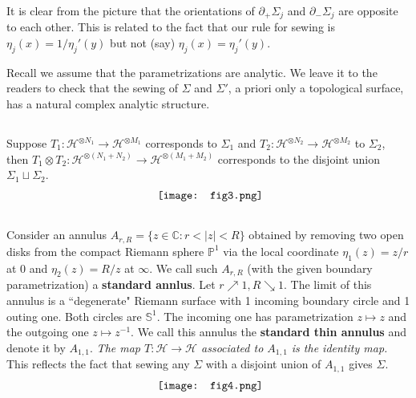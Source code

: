 \documentclass[12pt,a4paper,notitlepage]{article}
\theoremstyle{definition}
\theoremstyle{plain}
\newcommand{\mc}{\mathcal}
\newcommand{\Cbb}{\mathbb C}
\newcommand{\Pbb}{\mathbb P}
\newcommand{\Sbb}{{\mathbb S}}
\numberwithin{equation}{section}
\begin{document}
It is clear from the picture that the orientations of $\partial_+\Sigma_j$ and $\partial_-\Sigma_j$ are opposite to each other. This is related to the fact that our rule for sewing is $\eta_j(x)=1/\eta_j'(y)$ but not (say) $\eta_j(x)=\eta_j'(y)$.

Recall we assume that the parametrizations are analytic. We leave it to the readers to check that the sewing of $\Sigma$ and $\Sigma'$, a priori only a topological surface, has a natural complex analytic structure.


\subsection{}\label{lb5}
Suppose $T_1:\mc H^{\otimes N_1}\rightarrow\mc H^{\otimes M_1}$ corresponds to $\Sigma_1$ and $T_2:\mc H^{\otimes N_2}\rightarrow\mc H^{\otimes M_2}$ to $\Sigma_2$, then $T_1\otimes T_2:\mc H^{\otimes (N_1+N_2)}\rightarrow\mc H^{\otimes(M_1+M_2)}$ corresponds to the disjoint union $\Sigma_1\sqcup\Sigma_2$.
\begin{align*}
	\vcenter{\hbox{{
				\texttt{[image: fig3.png]}}}}
\end{align*}




\subsection{}\label{lb3}

Consider an annulus $A_{r,R}=\{z\in\Cbb:r<|z|<R\}$ obtained by removing two open  disks from the compact Riemann sphere $\Pbb^1$ via the local coordinate $\eta_1(z)=z/r$ at $0$ and $\eta_2(z)=R/z$ at $\infty$. We call such $A_{r,R}$ (with the given boundary parametrization) a \textbf{standard annlus}. Let $r\nearrow 1,R\searrow 1$. The limit of this annulus  is a ``degenerate" Riemann surface with 1 incoming boundary circle and 1 outing one. Both circles are $\Sbb^1$. The incoming one has parametrization $z\mapsto z$ and the outgoing one $z\mapsto z^{-1}$. We call this annulus the \textbf{standard thin annulus} and denote it by  $A_{1,1}$. \emph{The map $T:\mc H\rightarrow\mc H$ associated to  $A_{1,1}$ is the identity map.} This reflects the fact that sewing any $\Sigma$ with a disjoint union of $A_{1,1}$ gives $\Sigma$.
\begin{align*}
	\vcenter{\hbox{{
				\texttt{[image: fig4.png]}}}}
\end{align*}
\end{document}
